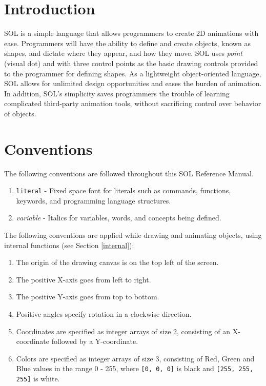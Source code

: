 
\section{Introduction}
SOL is a simple language that allows programmers to create 2D animations with ease. Programmers will have the ability to define and create objects, known as shapes, and dictate where they appear, and how they move. SOL uses \textit{point} (visual dot) and  with three control points as the basic drawing controls provided to the programmer for defining shapes. As a lightweight object-oriented language, SOL allows for unlimited design opportunities and eases the burden of animation. In addition, SOL’s simplicity saves programmers the trouble of learning complicated third-party animation tools, without sacrificing control over behavior of objects.
\par

\section{Conventions}
    The following conventions are followed throughout this SOL Reference Manual.

    \begin{enumerate}
        \itemsep0em
        \item \texttt{literal} - Fixed space font for literals such as commands, functions,\\
        \hspace*{4.4em} keywords, and programming language structures.
        
        \item \textit{variable} - Italics for variables, words, and concepts being defined.
    \end{enumerate}

    The following conventions are applied while drawing and animating objects, using internal functions (see Section \ref{internal}):

    \begin{enumerate}
        \itemsep0em
        \item The origin of the drawing canvas is on the top left of the screen.
        \item The positive X-axis goes from left to right.
        \item The positive Y-axis goes from top to bottom.
        \item Positive angles specify rotation in a clockwise direction.
        \item Coordinates are specified as integer arrays of size 2, consisting of an X-coordinate followed by a Y-coordinate.
        \item Colors are specified as integer arrays of size 3, consisting of Red, Green and Blue values in the range 0 - 255, where \texttt{[0, 0, 0]} is black and \texttt{[255, 255, 255]} is white.
    \end{enumerate}


